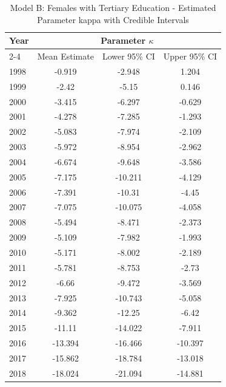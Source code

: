 \begin{landscape}
\begin{table}[htbp]
\centering
\caption{Model B: Females with Tertiary Education - Estimated Parameter kappa  with Credible Intervals}
\label{tab:parameters_k12}
\begin{tabular}{@{}lccc@{}}
\toprule
Year & \multicolumn{3}{c}{Parameter \(\kappa\)} \\
\cmidrule(lr){2-4}
      & Mean Estimate & Lower 95\% CI & Upper 95\% CI \\
\midrule
1998 & -0.919 & -2.948 & 1.204 \\
1999 & -2.42 & -5.15 & 0.146 \\
2000 & -3.415 & -6.297 & -0.629 \\
2001 & -4.278 & -7.285 & -1.293 \\
2002 & -5.083 & -7.974 & -2.109 \\
2003 & -5.972 & -8.954 & -2.962 \\
2004 & -6.674 & -9.648 & -3.586 \\
2005 & -7.175 & -10.211 & -4.129 \\
2006 & -7.391 & -10.31 & -4.45 \\
2007 & -7.075 & -10.075 & -4.058 \\
2008 & -5.494 & -8.471 & -2.373 \\
2009 & -5.109 & -7.982 & -1.993 \\
2010 & -5.171 & -8.002 & -2.189 \\
2011 & -5.781 & -8.753 & -2.73 \\
2012 & -6.66 & -9.472 & -3.569 \\
2013 & -7.925 & -10.743 & -5.058 \\
2014 & -9.362 & -12.25 & -6.42 \\
2015 & -11.11 & -14.022 & -7.911 \\
2016 & -13.394 & -16.466 & -10.397 \\
2017 & -15.862 & -18.784 & -13.018 \\
2018 & -18.024 & -21.094 & -14.881 \\
\bottomrule
\end{tabular}
\end{table}
\end{landscape}